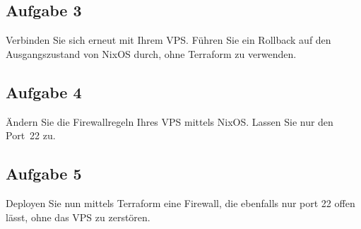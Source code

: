 \documentclass{article}
\begin{document}
    \subsection{Aufgabe 3}
    Verbinden Sie sich erneut mit Ihrem VPS. Führen Sie ein Rollback auf den Ausgangszustand von NixOS durch, ohne Terraform zu verwenden.

    \subsection{Aufgabe 4}
    Ändern Sie die Firewallregeln Ihres VPS mittels NixOS. Lassen Sie nur den Port 22 zu.
    
    \subsection{Aufgabe 5}
    Deployen Sie nun mittels Terraform eine Firewall, die ebenfalls nur port 22 offen lässt, ohne das VPS zu zerstören.
\end{document}
